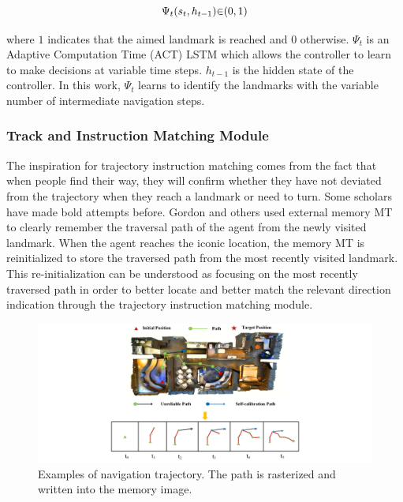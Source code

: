 \begin{equation}
	\centering
	{\Psi}_{t}({s}_{t},{h}_{t-1}){\in}{({0},{1})}
\end{equation}

where ${1}$ indicates that the aimed landmark is reached and ${0}$ otherwise. ${{\Psi}_{t}}$ is an Adaptive Computation Time (ACT) LSTM which allows the controller to learn to make decisions at variable time steps. ${h}_{t-1}$ is the hidden state of the controller. In this work, ${{\Psi}_{t}}$ learns to identify the landmarks with the variable number of intermediate navigation steps.

\subsubsection{Track and Instruction Matching Module}

The inspiration for trajectory instruction matching comes from the fact that when people find their way, they will confirm whether they have not deviated from the trajectory when they reach a landmark or need to turn. Some scholars have made bold attempts before. Gordon and others used external memory MT to clearly remember the traversal path of the agent from the newly visited landmark\cite{vasudevan2021talk2nav}. When the agent reaches the iconic location, the memory MT is reinitialized to store the traversed path from the most recently visited landmark. This re-initialization can be understood as focusing on the most recently traversed path in order to better locate and better match the relevant direction indication through the trajectory instruction matching module.

\begin{figure}[h]
	\centering
	\includegraphics[scale=1]{image06.png}
	\caption{Examples of navigation trajectory. The path is rasterized and written into the memory image.}
	\label{image06}
\end{figure}

